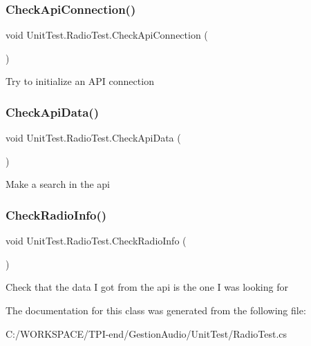 \subsubsection{\texorpdfstring{Check\+Api\+Connection()}{CheckApiConnection()}}
{\footnotesize\ttfamily void Unit\+Test.\+Radio\+Test.\+Check\+Api\+Connection (\begin{DoxyParamCaption}{ }\end{DoxyParamCaption})}



Try to initialize an A\+PI connection 

\mbox{\label{class_unit_test_1_1_radio_test_aef2bff78a59914b1c75dc01013fa8d1a}} 
\subsubsection{\texorpdfstring{Check\+Api\+Data()}{CheckApiData()}}
{\footnotesize\ttfamily void Unit\+Test.\+Radio\+Test.\+Check\+Api\+Data (\begin{DoxyParamCaption}{ }\end{DoxyParamCaption})}



Make a search in the api 

\mbox{\label{class_unit_test_1_1_radio_test_a3616a2504096bca4385994eee11aa116}} 
\subsubsection{\texorpdfstring{Check\+Radio\+Info()}{CheckRadioInfo()}}
{\footnotesize\ttfamily void Unit\+Test.\+Radio\+Test.\+Check\+Radio\+Info (\begin{DoxyParamCaption}{ }\end{DoxyParamCaption})}



Check that the data I got from the api is the one I was looking for 



The documentation for this class was generated from the following file\+:\begin{DoxyCompactItemize}
\item 
C\+:/\+W\+O\+R\+K\+S\+P\+A\+C\+E/\+T\+P\+I-\/end/\+Gestion\+Audio/\+Unit\+Test/Radio\+Test.\+cs\end{DoxyCompactItemize}

